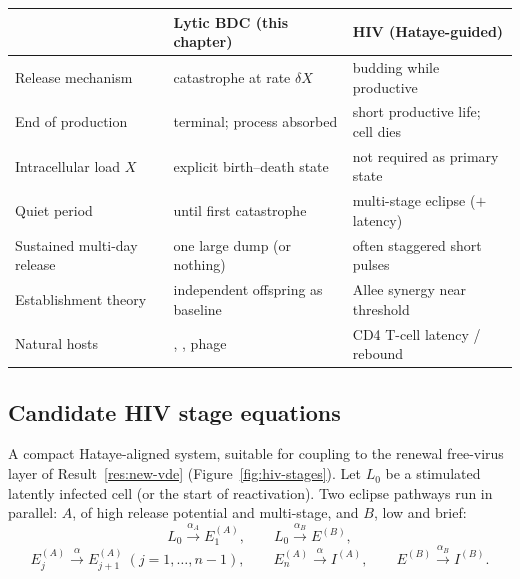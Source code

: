 \begin{center}
\renewcommand{\arraystretch}{1.2}
\small
\begin{tabular}{@{}lll@{}}
\toprule
 & Lytic BDC (this chapter) & HIV (Hataye-guided) \\
\midrule
Release mechanism & catastrophe at rate $\delta X$ & budding while productive \\
End of production & terminal; process absorbed & short productive life; cell dies \\
Intracellular load $X$ & explicit birth--death state & not required as primary state \\
Quiet period & until first catastrophe & multi-stage eclipse ($+$ latency) \\
Sustained multi-day release & one large dump (or nothing) & often staggered short pulses \\
Establishment theory & independent offspring as baseline & Allee synergy near threshold \\
Natural hosts & \yp{}, \ft{}, phage & CD4 T-cell latency / rebound \\
\bottomrule
\end{tabular}
\end{center}

\subsection{Candidate HIV stage equations}
\label{sec:hiv-eqns}

A compact Hataye-aligned system, suitable for coupling to the renewal
free-virus layer of Result~\ref{res:new-vde} (Figure~\ref{fig:hiv-stages}).
Let $L_0$ be a stimulated
latently infected cell (or the start of reactivation). Two eclipse pathways
run in parallel: $A$, of high release potential and multi-stage, and $B$,
low and brief:
\begin{equation}
L_0\xrightarrow{\alpha_A}E_1^{(A)},
\qquad
L_0\xrightarrow{\alpha_B}E^{(B)},
\end{equation}
\begin{equation}
E_j^{(A)}\xrightarrow{\alpha}E_{j+1}^{(A)}\ (j=1,\dots,n-1),
\qquad
E_n^{(A)}\xrightarrow{\alpha}I^{(A)},
\qquad
E^{(B)}\xrightarrow{\alpha_B}I^{(B)}.
\end{equation}

